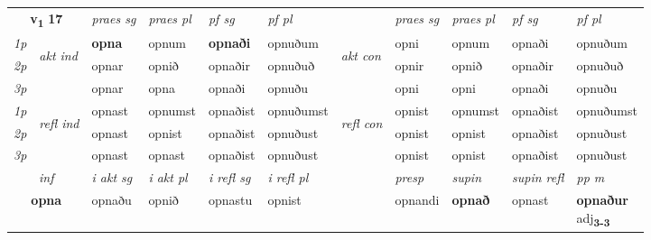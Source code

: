 \noindent
\begin{tabular}{lllllllllll} \toprule
\multicolumn{2}{c}{\textbf{v{\textsubscript{1}}} \Large{\textbf{17}}}  &  \textit{praes sg}  & \textit{praes pl}  &\textit{ pf sg} & \textit{pf pl} &  &  \textit{praes sg}  & \textit{praes pl}  & \textit{pf sg} & \textit{pf pl } \\*
	\cmidrule{3-6} \cmidrule{8-11}
 {\textit{1p}} & \multirow{3}{*}{\begin{turn}{90}\textit{akt ind}\end{turn}} & \textbf{opna} & opnum & \textbf{opnaði} & opnuðum & \multirow{3}{*}{\begin{turn}{90}\textit{akt con}\end{turn}} &opni & opnum & opnaði & opnuðum\\*
 {\textit{2p}} &  &  opnar  & opnið & opnaðir & opnuðuð & & opnir & opnið & opnaðir & opnuðuð \\*
{\textit{3p}} &  & opnar & opna & opnaði & opnuðu & & opni & opni& opnaði & opnuðu \\*
\cmidrule{3-6} \cmidrule{8-11}
 {\textit{1p}} & \multirow{3}{*}{\begin{turn}{90}\textit{refl ind}\end{turn}}  & opnast & opnumst & opnaðist & opnuðumst & \multirow{3}{*}{\begin{turn}{90}\textit{refl con}\end{turn}}  &opnist & opnumst & opnaðist & opnuðumst \\*
 {\textit{2p}} &  & opnast & opnist & opnaðist & opnuðust & &opnist & opnist & opnaðist & opnuðust \\*
 {\textit{3p}}  & & opnast & opnast & opnaðist & opnuðust & & opnist & opnist& opnaðist & opnuðust \\*
\cmidrule{3-6} \cmidrule{8-11}

   \multicolumn{2}{c}{\textit{inf}}  & \textit{i akt sg} & \textit{i akt pl} & \textit{i refl sg} & \textit{i refl pl} && \textit{presp} & \textit{supin} & \textit{supin refl} & \textit{pp m} \\*
  \multicolumn{2}{c}{\textbf{opna}} & opnaðu  & opnið & opnastu & opnist && opnandi &  \textbf{opnað} & opnast & \specialcell{\textbf{opnaður} \\ adj\textbf{\textsubscript{3-3}}} \\*
\end{tabular}

